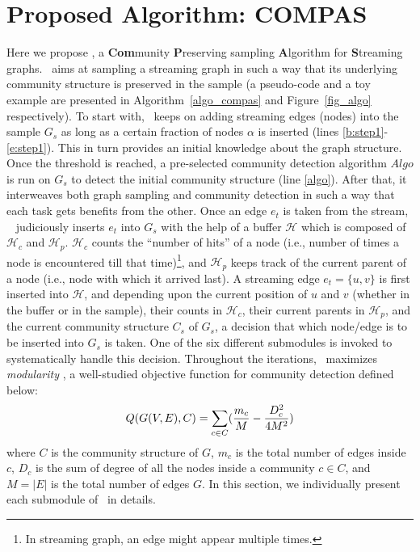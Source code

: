 \vspace{10mm}

\section{Proposed Algorithm: COMPAS}
\label{algorithm}

Here we propose \compas, a {\bf Com}munity {\bf P}reserving sampling {\bf A}lgorithm for {\bf S}treaming graphs.
\compas~aims at sampling a streaming graph in such a way that its underlying community structure is preserved in the sample (a pseudo-code and a toy example are presented in Algorithm~\ref{algo_compas} and Figure~\ref{fig_algo} respectively). To start with, \compas~keeps on adding streaming edges (nodes) into the sample $G_s$ as long as a certain fraction of nodes $\alpha$ is inserted (lines \ref{b:step1}-\ref{e:step1}). This in turn provides an initial knowledge about the graph structure. Once the threshold is reached, a pre-selected community detection algorithm $Algo$ is run on $G_s$ to detect the initial community structure (line \ref{algo}). After that, it interweaves both graph sampling and community detection in such a way that each task gets benefits from the other. Once an edge $e_t$ is taken from the stream, \compas~ judiciously inserts $e_t$ into $G_s$ with the help of a buffer $\mathcal{H}$ which is composed of $\mathcal{H}_c$ and $\mathcal{H}_p$. $\mathcal{H}_c$ counts the ``number of hits'' of a node (i.e., number of times a node is encountered till that time)\footnote{In streaming graph, an edge might appear multiple times.}, and $\mathcal{H}_p$ keeps track of the current parent of a node (i.e., node with which it arrived last). A streaming edge $e_t=\{u,v\}$ is first inserted into  $\mathcal{H}$, and depending upon the current position of $u$ and $v$ (whether in the buffer or in the sample), their counts in $\mathcal{H}_c$, their current parents in $\mathcal{H}_p$, and the current community structure $C_s$ of $G_s$, a decision that which node/edge is to be inserted into $G_s$ is taken. One of the six different submodules is invoked to systematically handle this decision.
Throughout the iterations, \compas~maximizes {\em modularity} \cite{newman2004analysis}, a well-studied objective function for community detection defined below:
\begin{equation}\label{modularity}\small
Q(G(V,E),C)=\sum_{c\in C} (\frac{m_c}{M} - \frac{D_c^2}{4M^2})
\end{equation}
where $C$ is the community structure of $G$, $m_c$ is the total number of edges inside $c$, $D_c$ is the sum of degree of all the nodes inside a community $c\in C$, and $M=|E|$ is the total number of edges $G$. In this section, we individually present each submodule of \compas~in details.

